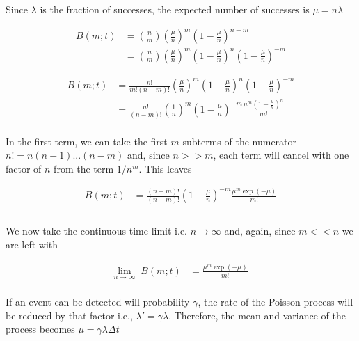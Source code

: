 \documentclass{article}
\begin{document}
Since $\lambda$ is the fraction of successes, the expected number of successes is $\mu = n\lambda$

\begin{align*}
B(m;t) &=  {n\choose m}\left(\frac{\mu}{n}\right)^{m}\left(1-\frac{\mu}{n}\right)^{n-m}\\
&= {n\choose m}\left(\frac{\mu}{n}\right)^{m}\left(1-\frac{\mu}{n}\right)^{n}\left(1-\frac{\mu}{n}\right)^{-m}
\end{align*}

\begin{align*}
B(m;t) &= \frac{n!}{m!(n-m)!}\left(\frac{\mu}{n}\right)^{m}\left(1-\frac{\mu}{n}\right)^{n}\left(1-\frac{\mu}{n}\right)^{-m}\\
&= \frac{n!}{(n-m)!}\left(\frac{1}{n}\right)^{m}\left(1-\frac{\mu}{n}\right)^{-m}\frac{\mu^{m}\left(1-\frac{\mu}{n}\right)^{n}}{m!}\\
\end{align*}

In the first term, we can take the first $m$ subterms of the numerator $n! = n(n-1)...(n-m)$ and, since $n>>m$, each term will cancel with one factor of $n$ from the term $1/n^{m}$. This leaves

\begin{align*}
B(m;t) &= \frac{(n-m)!}{(n-m)!}\left(1-\frac{\mu}{n}\right)^{-m}\frac{\mu^{m}\exp(-\mu)}{m!}\\\\
\end{align*}

We now take the continuous time limit i.e. $n\rightarrow\infty$ and, again, since $m << n$ we are left with 

\begin{align*}
\underset{n\rightarrow\infty}{\mathrm{lim}} \;\; B(m;t) &= \frac{\mu^{m}\exp(-\mu)}{m!}\\
\end{align*}

If an event can be detected will probability $\gamma$, the rate of the Poisson process will be reduced by that factor i.e., $\lambda' = \gamma\lambda$. Therefore, the mean and variance of the process becomes $\mu = \gamma\lambda\Delta t$
\end{document}
